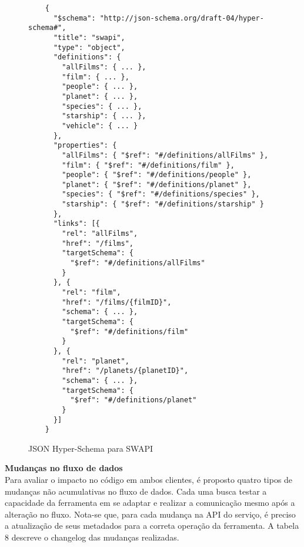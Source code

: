 \begin{figure}[H]
  \centering
  \begin{verbatim}
    {
      "$schema": "http://json-schema.org/draft-04/hyper-schema#",
      "title": "swapi",
      "type": "object",
      "definitions": {
        "allFilms": { ... },
        "film": { ... },
        "people": { ... },
        "planet": { ... },
        "species": { ... },
        "starship": { ... },
        "vehicle": { ... }
      },
      "properties": {
        "allFilms": { "$ref": "#/definitions/allFilms" },
        "film": { "$ref": "#/definitions/film" },
        "people": { "$ref": "#/definitions/people" },
        "planet": { "$ref": "#/definitions/planet" },
        "species": { "$ref": "#/definitions/species" },
        "starship": { "$ref": "#/definitions/starship" }
      },
      "links": [{
        "rel": "allFilms",
        "href": "/films",
        "targetSchema": {
          "$ref": "#/definitions/allFilms"
        }
      }, {
        "rel": "film",
        "href": "/films/{filmID}",
        "schema": { ... },
        "targetSchema": {
          "$ref": "#/definitions/film"
        }
      }, {
        "rel": "planet",
        "href": "/planets/{planetID}",
        "schema": { ... },
        "targetSchema": {
          "$ref": "#/definitions/planet"
        }
      }]
    }
  \end{verbatim}
  \caption{JSON Hyper-Schema para SWAPI}
\end{figure}

\textbf{Mudanças no fluxo de dados} \\

Para avaliar o impacto no código em ambos clientes, é proposto quatro tipos de mudanças não acumulativas no fluxo de dados. Cada uma busca testar a capacidade da ferramenta em se adaptar e realizar a comunicação mesmo após a alteração no fluxo. Nota-se que, para cada mudança na API do serviço, é preciso a atualização de seus metadados para a correta operação da ferramenta. A tabela 8 descreve o changelog das mudanças realizadas.

